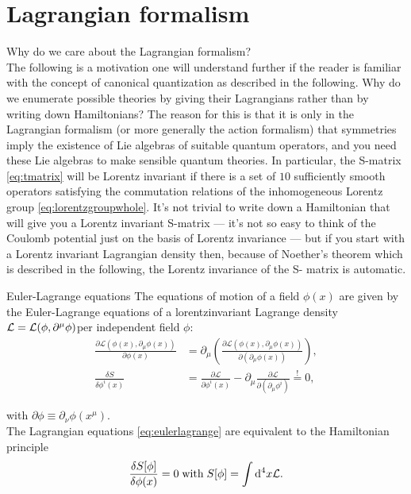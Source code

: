 \section{Lagrangian formalism}
Why do we care about the Lagrangian formalism?\\
The following is a motivation one will understand further if the reader is familiar with the concept of canonical quantization as described in the following.
 Why do we enumerate possible theories by giving their Lagrangians rather than by writing down Hamiltonians? The reason for this is that it is
only in the Lagrangian formalism (or more generally the action
formalism) that symmetries imply the existence of Lie algebras of
suitable quantum operators, and you need these Lie algebras to
make sensible quantum theories. In particular, the S-matrix \ref{eq:tmatrix} will
be Lorentz invariant if there is a set of $10$ sufficiently smooth operators satisfying the commutation relations of the inhomogeneous Lorentz group \ref{eq:lorentzgroupwhole}. It’s not trivial to write down a Hamiltonian that will give you a Lorentz invariant S-matrix — it’s not so easy
to think of the Coulomb potential just on the basis of Lorentz invariance — but if you start with a Lorentz invariant Lagrangian
density then, because of Noether’s theorem which is described in the following, the Lorentz invariance of the S- matrix is automatic.
\begin{mybox}{Euler-Lagrange equations}
	The equations of motion of a field $\phi(x)$ are given by the Euler-Lagrange equations of a lorentzinvariant Lagrange density $\mathcal{L} = \mathcal{L}(\phi,\partial^\mu\phi)$per independent field $\phi$:
	\begin{align}
	\label{eq:eulerlagrange}
	\frac{\partial \mathcal{L}\left(\phi(x),\partial_{\mu}\phi(x)\right)}{\partial \phi(x)} &= \partial_{\mu} \left(\frac{\partial \mathcal{L}(\phi(x),\partial_{\mu} \phi(x))}{\partial (\partial_{\mu} \phi(x))}\right),\\
	\frac{\delta S}{\delta \phi^i(x)} &= \frac{\partial \mathcal{L}}{\partial \phi^i(x)} - \partial_{\mu} \frac{\partial \mathcal{L}}{\partial(\partial_{\mu} \phi^i)} \stackrel{!}{=}0,
	\end{align}
	
	with $\partial \phi \equiv \partial_{\nu}\phi(x^{\mu})$.\\
	The Lagrangian equations \ref{eq:eulerlagrange} are equivalent to the Hamiltonian principle
	\begin{equation}
		\frac{\delta S[\phi]}{\delta \phi(x)} = 0 \; \mathrm{with} \; S[\phi] = \int \mathrm{d}^4 x \mathcal{L}.
	\end{equation}
\end{mybox}

